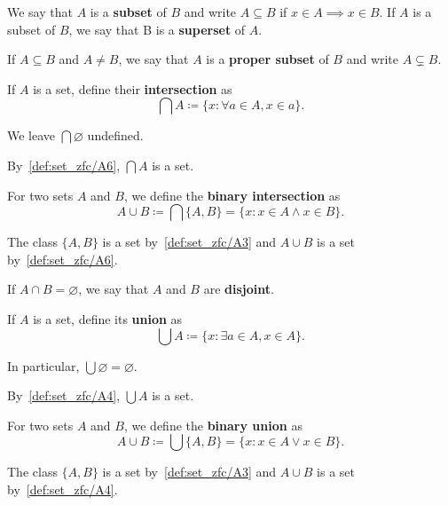 \begin{definition}\label{def:subset}
  We say that \( A \) is a \textbf{subset} of \( B \) and write \( A \subseteq B \) if \( x \in A \implies x \in B \). If \( A \) is a subset of \( B \), we say that B is a \textbf{superset} of \( A \).

  If \( A \subseteq B \) and \( A \neq B \), we say that \( A \) is a \textbf{proper subset} of \( B \) and write \( A \subsetneq B \).
\end{definition}

\begin{definition}\label{def:set_intersection}\cite[24]{Enderton1977}
  If \( A \) is a set, define their \textbf{intersection} as
  \begin{equation*}
    \bigcap A \coloneqq \{ x \colon \forall a \in A, x \in a \}.
  \end{equation*}

  We leave \( \bigcap \varnothing \) undefined.

  By~\ref{def:set_zfc/A6}, \( \bigcap A \) is a set.

  For two sets \( A \) and \( B \), we define the \textbf{binary intersection} as
  \begin{equation*}
    A \cup B \coloneqq \bigcap \{ A, B \} = \{ x \colon x \in A \land x \in B \}.
  \end{equation*}

  The class \( \{ A, B \} \) is a set by~\ref{def:set_zfc/A3} and \( A \cup B \) is a set by~\ref{def:set_zfc/A6}.

  If \( A \cap B = \varnothing \), we say that \( A \) and \( B \) are \textbf{disjoint}.
\end{definition}

\begin{definition}\label{def:set_union}\cite[24]{Enderton1977}
  If \( A \) is a set, define its \textbf{union} as
  \begin{equation*}
    \bigcup A \coloneqq \{ x \colon \exists a \in A, x \in A \}.
  \end{equation*}

  In particular, \( \bigcup \varnothing = \varnothing \).

  By~\ref{def:set_zfc/A4}, \( \bigcup A \) is a set.

  For two sets \( A \) and \( B \), we define the \textbf{binary union} as
  \begin{equation*}
    A \cup B \coloneqq \bigcup \{ A, B \} = \{ x \colon x \in A \lor x \in B \}.
  \end{equation*}

  The class \( \{ A, B \} \) is a set by~\ref{def:set_zfc/A3} and \( A \cup B \) is a set by~\ref{def:set_zfc/A4}.
\end{definition}

